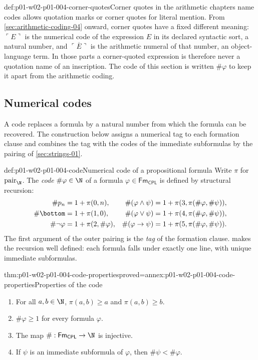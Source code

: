 \begin{hbwarning}{def:p01-w02-p01-004-corner-quotes}{Corner quotes in the arithmetic chapters name codes}
 allows quotation marks or corner quotes for literal
mention. From \cref{sec:arithmetic-coding-04} onward, corner quotes have a
fixed different meaning: \(\ulcorner E\urcorner\) is the numerical code of the
expression \(E\) in its declared syntactic sort, a natural number, and
\(\overline{\ulcorner E\urcorner}\) is the arithmetic numeral of that number,
an object-language term. In those parts a corner-quoted expression is
therefore never a quotation name of an inscription. The code of this section
is written \(\#\varphi\) to keep it apart from the arithmetic coding.
\end{hbwarning}

\subsection{Numerical codes}
\label{sec:p01-w02-p01-004-codes}

A code replaces a formula by a natural number from which the formula can be
recovered. The construction below assigns a numerical tag to each formation
clause and combines the tag with the codes of the immediate subformulas by
the pairing of \cref{sec:strings-01}.

\begin{hbdefinition}{def:p01-w02-p01-004-code}{Numerical code of a propositional formula}
Write \(\pi\) for \(\operatorname{pair}_{\N}\). The \emph{code}
\(\#\varphi\in\N\) of a formula \(\varphi\in\mathsf{Fm}_{\mathsf{CPL}}\) is
defined by structural recursion:
\[
\begin{aligned}
 \#p_n&=1+\pi(0,n),&
 \#(\varphi\land\psi)&=1+\pi(3,\pi(\#\varphi,\#\psi)),\\
 \#\bottom&=1+\pi(1,0),&
 \#(\varphi\lor\psi)&=1+\pi(4,\pi(\#\varphi,\#\psi)),\\
 \#\neg\varphi&=1+\pi(2,\#\varphi),&
 \#(\varphi\to\psi)&=1+\pi(5,\pi(\#\varphi,\#\psi)).
\end{aligned}
\]
The first argument of the outer pairing is the \emph{tag} of the formation
clause.  makes the recursion well defined:
each formula falls under exactly one line, with unique immediate
subformulas.
\end{hbdefinition}

\begin{hbtheorem}{thm:p01-w02-p01-004-code-properties}{proved=annex:p01-w02-p01-004-code-properties}{Properties of the code}
\begin{enumerate}
  \item For all \(a,b\in\N\), \(\pi(a,b)\ge a\) and \(\pi(a,b)\ge b\).
  \item \(\#\varphi\ge1\) for every formula \(\varphi\).
  \item The map \(\#:\mathsf{Fm}_{\mathsf{CPL}}\to\N\) is injective.
  \item If \(\psi\) is an immediate subformula of \(\varphi\), then
        \(\#\psi<\#\varphi\).
\end{enumerate}
\end{hbtheorem}

